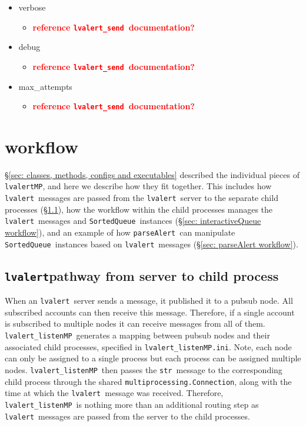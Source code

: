 \documentclass{article}
\newcommand{\FIXME}[1]{\textcolor{red}{\textbf{#1}}}
\newcommand{\multiprocessingConnection}{\texttt{multiprocessing.Connection}}
\newcommand{\alert}{\texttt{lvalert}}
\newcommand{\lvalertSend}{\texttt{lvalert\_send}}
\newcommand{\lvalertMP}{\texttt{lvalertMP}}
\newcommand{\lvalertListenMP}{\texttt{lvalert\_listenMP}}
\newcommand{\parseAlert}{\texttt{parseAlert}}
\newcommand{\SortedQueue}{\texttt{SortedQueue}}
\newcommand{\lvalertMPini}{\texttt{lvalert\_listenMP.ini}}
\newcommand{\pythonstr}{\texttt{str}}
\begin{document}
\begin{itemize}
{\begin{itemize}
        \end{itemize}
         }
    \item{verbose
        \begin{itemize}
            \item{\FIXME{reference \lvalertSend~documentation?}}
        \end{itemize}
         }
    \item{debug
        \begin{itemize}
            \item{\FIXME{reference \lvalertSend~documentation?}}
        \end{itemize}
         }
    \item{max\_attempts
        \begin{itemize}
            \item{\FIXME{reference \lvalertSend~documentation?}}
        \end{itemize}
         }
\end{itemize}


\section{workflow}
\label{sec: workflow}

\S\ref{sec: classes, methods, configs and executables} described the individual pieces of \lvalertMP, and here we describe how they fit together.
This includes how \alert~messages are passed from the \alert~server to the separate child processes (\S\ref{sec: passing alerts}), how the workflow within the child processes manages the \alert~messages and \SortedQueue~instances (\S\ref{sec: interactiveQueue workflow}), and an example of how \parseAlert~can manipulate \SortedQueue~instances based on \alert~messages (\S\ref{sec: parseAlert workflow}).


\subsection{\alert pathway from server to child process}
\label{sec: passing alerts}

When an \alert~server sends a message, it published it to a pubsub node.
All subscribed accounts can then receive this message.
Therefore, if a single account is subscribed to multiple nodes it can receive messages from all of them.
\lvalertListenMP~generates a mapping between pubsub nodes and their associated child processes, specified in \lvalertMPini.
Note, each node can only be assigned to a single process but each process can be assigned multiple nodes.
\lvalertListenMP~then passes the \pythonstr~message to the corresponding child process through the shared \multiprocessingConnection, along with the time at which the \alert~message was received.
Therefore, \lvalertListenMP~is nothing more than an additional routing step as \alert~messages are passed from the server to the child processes.
\end{document}

